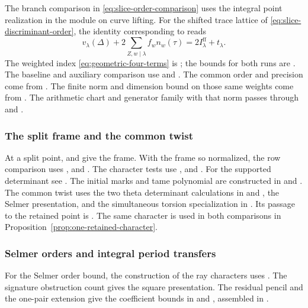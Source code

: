 The branch comparison in \eqref{eq:slice-order-comparison} uses
the integral point realization in the module on curve lifting.
For the shifted trace lattice of \eqref{eq:slice-discriminant-order},
the identity corresponding to  reads
\[
 v_\lambda(\Delta)+2\sum_{Z,w\mid\lambda} f_w n_w(\tau)
       =2I^{\mathrm{ff}}_\lambda+t_\lambda .
\]
The weighted index \eqref{eq:geometric-four-terms} is
; the bounds for both runs are . The baseline and auxiliary
comparison use  and
. The common order and precision come from
. \cite{release-selected-points,release-slice-orders,release-run-remainder,release-finite-point-depth,release-slice-scale-record}
The finite norm and dimension bound on those same weights come
from . The arithmetic chart and generator
family with that norm passes through 
and . \cite{release-slice-net-evaluation,release-slice-net-index}

\subsubsection{The split frame and the common twist}
At a split point,  and 
give the frame. With the frame so normalized, the row comparison uses ,
 and .
The character tests use , 
and . For the supported determinant see
. The initial marks and tame polynomial
are constructed in \allowbreak{}\allowbreak{} and
\allowbreak{}\allowbreak{}\allowbreak{}\allowbreak{}\allowbreak{}\allowbreak{}. The common twist
uses the two theta determinant calculations in
\allowbreak{}\allowbreak{} and \allowbreak{}\allowbreak{}\allowbreak{}, the
Selmer presentation, and the simultaneous torsion specialization
in \allowbreak{}\allowbreak{}\allowbreak{}\allowbreak{}. Its passage to the
retained point is . The same character
is used in both comparisons in Proposition~\ref{prop:one-retained-character}.
\subsubsection{Selmer orders and integral period transfers}
For the Selmer order bound, the construction of the ray characters uses . The signature obstruction
count gives the square presentation. The residual pencil and
the one-pair extension give the coefficient bounds in
\allowbreak{}
and , assembled in
. \cite{release}


